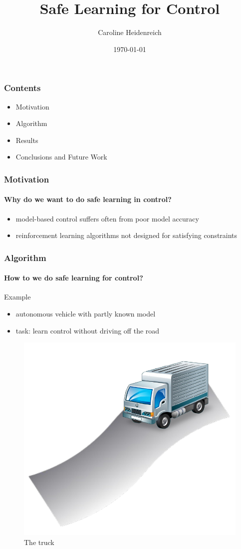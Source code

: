 \documentclass[t]{beamer}
\title[Inisintiur sequi aliquia tis dis in para] 
{%
  Safe Learning for Control%
}
\author[Oskar, Friends]
{
Caroline Heidenreich
}
\institute{}
\date{\today}
\begin{document}
\begin{frame}
\titlepage
\end{frame}


\begin{frame}
\frametitle{Contents}

\begin{itemize}
\item Motivation
\item Algorithm
\item Results
\item Conclusions and Future Work
\end{itemize}
\end{frame}

\begin{frame}
\frametitle{Motivation}
\framesubtitle{Why do we want to do safe learning in control?}
\begin{itemize}
\item model-based control suffers often from poor model accuracy
\item reinforcement learning algorithms not designed for satisfying constraints
\end{itemize}

\end{frame}


\begin{frame}
\frametitle{Algorithm}
\framesubtitle{How to we do safe learning for control?}
Example
\begin{itemize}
\item autonomous vehicle with partly known model
\item task: learn control without driving off the road
\end{itemize}

\begin{figure}[h!]
\includegraphics[width=0.4\paperwidth]{TruckOnStreet}
\caption{The truck}
\end{figure}


\end{frame}
\end{document}
